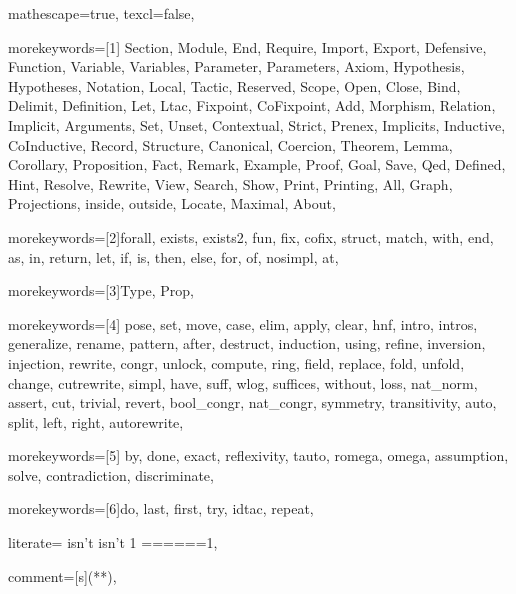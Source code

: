 
 {

mathescape=true,						
texcl=false,

morekeywords=[1]{
Section, Module, End, Require, Import, Export, Defensive, Function,
Variable, Variables, Parameter, Parameters, Axiom, Hypothesis, Hypotheses,
Notation, Local, Tactic, Reserved, Scope, Open, Close, Bind, Delimit,
Definition, Let, Ltac, Fixpoint, CoFixpoint, Add, Morphism, Relation,
Implicit, Arguments, Set, Unset, Contextual, Strict, Prenex, Implicits,
Inductive, CoInductive, Record, Structure, Canonical, Coercion,
Theorem, Lemma, Corollary, Proposition, Fact, Remark, Example,
Proof, Goal, Save, Qed, Defined, Hint, Resolve, Rewrite, View,
Search, Show, Print, Printing, All, Graph, Projections, inside,
outside, Locate, Maximal, About},

morekeywords=[2]{forall, exists, exists2, fun, fix, cofix, struct,
      match, with, end, as, in, return, let, if, is, then, else,
      for, of, nosimpl, at},

morekeywords=[3]{Type, Prop},

morekeywords=[4]{
         pose, set, move, case, elim, apply, clear,
            hnf, intro, intros, generalize, rename, pattern, after,
	    destruct, induction, using, refine, inversion, injection,
         rewrite, congr, unlock, compute, ring, field,
            replace, fold, unfold, change, cutrewrite, simpl,
         have, suff, wlog, suffices, without, loss, nat_norm,
            assert, cut, trivial, revert, bool_congr, nat_congr,
	 symmetry, transitivity, auto, split, left, right, autorewrite},        

morekeywords=[5]{
         by, done, exact, reflexivity, tauto, romega, omega,
         assumption, solve, contradiction, discriminate},


morekeywords=[6]{do, last, first, try, idtac, repeat},

literate=
	{isn't }{{{\ttfamily\color{dkgreen} isn't }}}1
	{===}{{{\color{dkgrey}===}}}1,

comment=[s]{(*}{*)},

}
